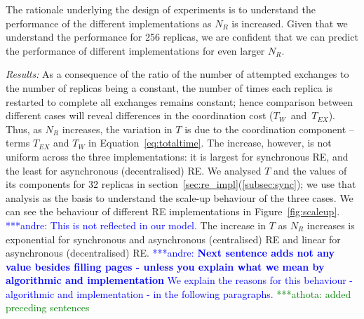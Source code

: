 \documentclass{rspublic}
\newcommand{\alnote}[1]{ {\textcolor{blue} { ***andre: #1 }}}
\newcommand{\athotanote}[1]{ {\textcolor{green} { ***athota: #1 }}}
\newcommand{\alnote}[1]{}
\newcommand{\athotanote}[1]{}
\begin{document}
The rationale underlying the design of experiments is to understand
the performance of the different implementations as $N_R$ is
increased. Given that we understand the performance for 256 replicas,
we are confident that we can predict the performance of different
implementations for even larger $N_R$.



{\it Results:}   %
As a consequence of the ratio of the number of attempted exchanges to
the number of replicas being a constant, the number of times each
replica is restarted to complete all exchanges remains constant; hence
comparison between different cases will reveal differences in the
coordination cost ($T_W$~and~$T_{EX}$).  Thus, as $N_R$ increases, the
variation in $T$ is due to the coordination component -- terms
$T_{EX}$ and $T_W$ in Equation~\ref{eq:totaltime}.  The increase,
however, is not uniform across the three implementations: it is
largest for synchronous RE, and the least for asynchronous
(decentralised) RE.  We analysed $T$ and the values of its components
for 32 replicas in section~\ref{sec:re_impl}(\ref{subsec:sync}); we 
use that analysis as the basis to understand the scale-up behaviour 
of the three cases. We can see the behaviour of different RE 
implementations in Figure~\ref{fig:scaleup}. %
\alnote{This is not reflected in our model.}
The increase in $T$ as $N_R$ increases is exponential for synchronous and 
asynchronous (centralised) RE and linear for asynchronous (decentralised) 
RE. 
\alnote{\textbf{Next sentence adds not any value besides filling pages - unless
you explain what we mean by algorithmic and implementation} We explain the
reasons for this behaviour - algorithmic and implementation - in the following
paragraphs. } \athotanote{added preceding sentences}
 
\end{document}

